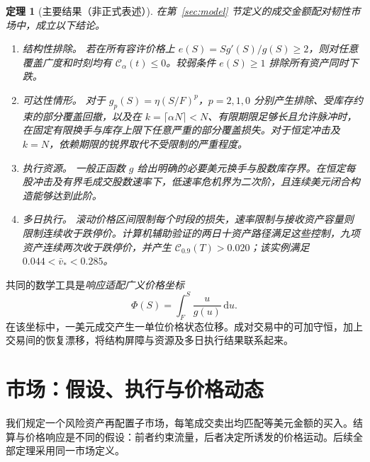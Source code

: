 \documentclass[11pt]{article}
\numberwithin{equation}{section}
\newtheorem{theorem}{定理}[section]
\theoremstyle{definition}
\theoremstyle{remark}
\newcommand{\Cris}{\mathcal{C}}
\newcommand{\dd}{\,\mathrm{d}}
\begin{document}
\begin{theorem}[主要结果（非正式表述）]\label{thm:informal}
在第~\ref{sec:model} 节定义的成交金额配对韧性市场中，成立以下结论。
\begin{enumerate}[label=\textup{(\roman*)},leftmargin=2em,itemsep=0.12em]
\item \emph{结构性排除。} 若在所有容许价格上 $e(S)=Sg'(S)/g(S)\ge2$，则对任意覆盖广度和时刻均有 $\Cris_\alpha(t)\le0$。较弱条件 $e(S)\ge1$ 排除所有资产同时下跌。
\item \emph{可达性情形。} 对于 $g_p(S)=\eta(S/F)^p$，$p=2,1,0$ 分别产生排除、受库存约束的部分覆盖回撤，以及在 $k=\lceil\alpha N\rceil<N$、有限期限足够长且允许脉冲时，在固定有限换手与库存上限下任意严重的部分覆盖损失。对于恒定冲击及 $k=N$，依赖期限的锐界取代不受限制的严重程度。
\item \emph{执行资源。} 一般正函数 $g$ 给出明确的必要美元换手与股数库存界。在恒定每股冲击及有界毛成交股数速率下，低速率危机界为二次阶，且连续美元闭合构造能够达到此阶。
\item \emph{多日执行。} 滚动价格区间限制每个时段的损失，速率限制与接收资产容量则限制连续收于跌停价。计算机辅助验证的两日十资产路径满足这些控制，九项资产连续两次收于跌停价，并产生 $\Cris_{0.9}(T)>0.020$；该实例满足 $0.044<\bar v_*<0.285$。
\end{enumerate}
\end{theorem}

共同的数学工具是\emph{响应适配广义价格坐标}
\begin{equation}\label{eq:phi-intro}
\Phi(S)=\int_F^S\frac{u}{g(u)}\dd u.
\end{equation}
在该坐标中，一美元成交产生一单位价格状态位移。成对交易中的可加守恒，加上交易间的恢复漂移，将结构屏障与资源及多日执行结果联系起来。

\section{市场：假设、执行与价格动态}\label{sec:micro}\label{sec:model}
我们规定一个风险资产再配置子市场，每笔成交卖出均匹配等美元金额的买入。结算与价格响应是不同的假设：前者约束流量，后者决定所诱发的价格运动。后续全部定理采用同一市场定义。
\end{document}
